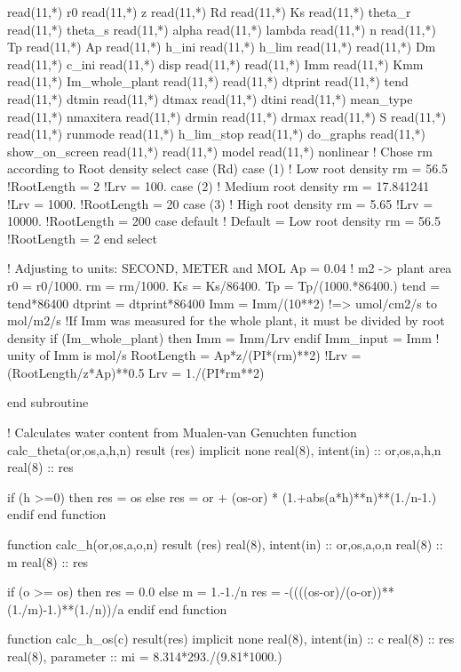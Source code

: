   read(11,*) r0
  read(11,*) z
  read(11,*) Rd
  read(11,*) Ks
  read(11,*) theta_r
  read(11,*) theta_s
  read(11,*) alpha
  read(11,*) lambda
  read(11,*) n
  read(11,*) Tp
  read(11,*) Ap
  read(11,*) h_ini
  read(11,*) h_lim
  read(11,*)
  read(11,*) Dm
  read(11,*) c_ini
  read(11,*) disp
  read(11,*)
  read(11,*) Imm
  read(11,*) Kmm
  read(11,*) Im_whole_plant
  read(11,*)
  read(11,*) dtprint
  read(11,*) tend
  read(11,*) dtmin
  read(11,*) dtmax
  read(11,*) dtini
  read(11,*) mean_type
  read(11,*) nmaxitera
  read(11,*) drmin
  read(11,*) drmax
  read(11,*) S
  read(11,*)
  read(11,*) runmode
  read(11,*) h_lim_stop
  read(11,*) do_graphs
  read(11,*) show_on_screen
  read(11,*)
  read(11,*) model
  read(11,*) nonlinear
  ! Chose rm according to Root density
  select case (Rd) 
    case (1)		! Low root density
      rm = 56.5
      !RootLength = 2 
      !Lrv = 100.
    case (2)		! Medium root density
      rm = 17.841241
      !Lrv = 1000.
      !RootLength = 20
    case (3)		! High root density
      rm = 5.65
      !Lrv = 10000.
      !RootLength = 200
    case default	! Default = Low root density
      rm = 56.5
      !RootLength = 2
  end select

  ! Adjusting to units: SECOND, METER and MOL
  Ap = 0.04   ! m2 -> plant area
  r0 = r0/1000.
  rm = rm/1000.
  Ks = Ks/86400.
  Tp = Tp/(1000.*86400.)
  tend = tend*86400
  dtprint = dtprint*86400
  Imm = Imm/(10**2) !=> umol/cm2/s to mol/m2/s
  !If Imm was measured for the whole plant, it must be divided by root density
  if (Im_whole_plant) then
    Imm = Imm/Lrv
  endif
  Imm_input = Imm
  ! unity of Imm is mol/s
  RootLength = Ap*z/(PI*(rm)**2)
  !Lrv = (RootLength/z*Ap)**0.5
  Lrv = 1./(PI*rm**2)

end subroutine

! Calculates water content from Mualen-van Genuchten
function calc_theta(or,os,a,h,n) result (res)
implicit none
  real(8), intent(in) :: or,os,a,h,n
  real(8) 	      :: res
  
  if (h >=0) then
    res = os
  else
    res = or + (os-or) * (1.+abs(a*h)**n)**(1./n-1.)
  endif
end function

function calc_h(or,os,a,o,n) result (res)
  real(8), intent(in) :: or,os,a,o,n
  real(8) :: m
  real(8) 	      :: res

  if (o >= os) then
    res = 0.0
  else
    m = 1.-1./n
    res = -((((os-or)/(o-or))**(1./m)-1.)**(1./n))/a
  endif
end function

function calc_h_os(c) result(res)
implicit none
  real(8), intent(in) :: c
  real(8)	      :: res
  real(8), parameter  :: mi = 8.314*293./(9.81*1000.)
  
